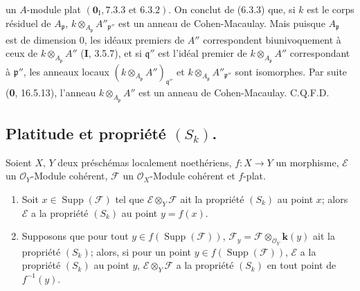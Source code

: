 un $A$-module plat $(\mathbf{0}_{\mathrm I}, 7.3.3\text{ et }6.3.2)$. On conclut de (6.3.3)
que, si $k$ est le corps résiduel de $A_{\mathfrak p}$,
$k\otimes_{A_{\mathfrak p}}A''_{\mathfrak p''}$ est un anneau de
Cohen-Macaulay. Mais puisque $A_{\mathfrak p}$ est de dimension $0$, les
idéaux premiers de $A''$ correspondent biunivoquement à ceux de
$k\otimes_{A_{\mathfrak p}}A''$ (\textbf{I}, 3.5.7), et si $\mathfrak q''$ est l'idéal
premier de $k\otimes_{A_{\mathfrak p}}A''$ correspondant à
$\mathfrak p''$, les anneaux locaux
$(k\otimes_{A_{\mathfrak p}}A'')_{\mathfrak q''}$ et
$k\otimes_{A_{\mathfrak p}}A''_{\mathfrak p''}$ sont isomorphes. Par suite
(\textbf{0}, 16.5.13), l'anneau $k\otimes_{A_{\mathfrak p}}A''$ est un anneau de
Cohen-Macaulay. C.Q.F.D.

\subsection{\texorpdfstring{Platitude et propriété $(S_k)$.}{Platitude et propriété (S\string_k)}}

\begin{proposition}[6.4.1]
\label{IV.2.s6.4.1-fr}
Soient $X$, $Y$ deux préschémas localement noethériens, $f:X\to Y$ un
morphisme, $\mathscr E$ un $\mathcal O_Y$-Module cohérent,
$\mathscr F$ un $\mathcal O_X$-Module cohérent et $f$-plat.
\begin{enumerate}
\item[\textup{(i)}] Soit $x\in\operatorname{Supp}(\mathscr F)$ tel que
$\mathscr E\otimes_Y\mathscr F$ ait la propriété $(S_k)$ au point $x$; alors
$\mathscr E$ a la propriété $(S_k)$ au point $y=f(x)$.
\item[\textup{(ii)}] Supposons que pour tout
$y\in f(\operatorname{Supp}(\mathscr F))$,
$\mathscr F_y=\mathscr F\otimes_{\mathcal O_Y}\boldsymbol{k}(y)$ ait la propriété
$(S_k)$; alors, si pour un point
$y\in f(\operatorname{Supp}(\mathscr F))$, $\mathscr E$ a la propriété
$(S_k)$ au point $y$, $\mathscr E\otimes_Y\mathscr F$ a la propriété
$(S_k)$ en tout point de $f^{-1}(y)$.
\end{enumerate}
\end{proposition}

